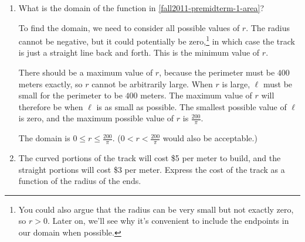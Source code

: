 \documentclass{article}
\begin{document}
\begin{enumerate}
\begin{enumerate}
  \item
    \begin{problem}[\nstretch{0.25}]
      What is the domain of the function in \ref{fall2011-premidterm-1-area}? 
    \end{problem}

    \begin{solution}
      To find the domain, we need to consider all possible values of $r$. The radius
      cannot be negative, but it could potentially be
      zero,\footnote{You could also argue that the radius can be very small
      but not exactly zero, so $r > 0$. Later on, we'll see why it's
      convenient to include the endpoints in our domain when possible.}
      in which case the track is just
      a straight line back and forth. This is the minimum value of $r$.
      
      There should be a maximum value of $r$,
      because the perimeter must be $400$ meters exactly, 
      so $r$ cannot be arbitrarily large. 
      When $r$ is large, $\ell$ must be small for the perimeter to be $400$ meters. 
      The maximum value of $r$ will therefore be when $\ell$ is as small as possible.
      The smallest possible value of $\ell$ is zero, and the maximum possible value of $r$
      is $\frac{200}{\pi}$.

      The domain is $0 \leq r \leq \frac{200}{\pi}$. ($0 < r < \frac{200}{\pi}$ would also be acceptable.)
    \end{solution}

  \item \label{fall2011-premidterm-1-cost}
    \begin{problem}[\vfill]
      The curved portions of the track will cost \$5 per meter to build, and the straight portions will cost \$3 per meter. Express the cost of the track as a function of the radius of the ends.
    \end{problem}


\end{enumerate}
\end{enumerate}
\end{document}
